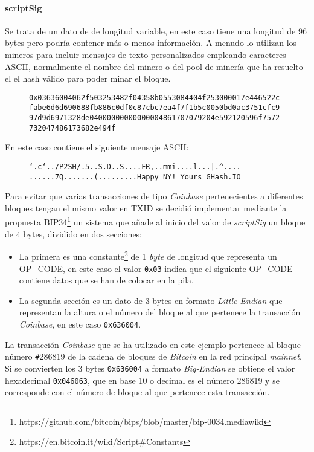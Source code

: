 \documentclass{article}
\begin{document}
    \paragraph{scriptSig}
    Se trata de un dato de de longitud variable, en este caso tiene una longitud de 96 bytes pero podría contener más o menos información. A menudo lo utilizan los mineros para incluir mensajes de texto personalizados empleando caracteres ASCII, normalmente el nombre del minero o del pool de minería que ha resuelto el el hash válido para poder minar el bloque.
    \begin{figure}[H]
        \texttt{0x03636004062f503253482f04358b0553084404f253000017e446522c} \\
        \texttt{fabe6d6d690688fb886c0df0c87cbc7ea4f7f1b5c0050bd0ac3751cfc9}
        \texttt{97d9d6971328de04000000000000004861707079204e592120596f7572}
        \texttt{732047486173682e494f}
    \end{figure}
    
    En este caso contiene el siguiente mensaje ASCII:
    \begin{figure}[H]
    \centering
        \texttt{`.c`../P2SH/.5..S.D..S....FR,..mmi....l...|.\textasciicircum....}
        \texttt{......7Q.......(.........Happy NY! Yours GHash.IO}
    \end{figure}
    
    Para evitar que varias transacciones de tipo \textit{Coinbase} pertenecientes a diferentes bloques tengan el mismo valor en TXID se decidió implementar mediante la propuesta BIP34\footnote{https://github.com/bitcoin/bips/blob/master/bip-0034.mediawiki} un sistema que añade al inicio del valor de \textit{scriptSig} un bloque de 4 bytes, dividido en dos secciones:
    
    \begin{itemize}
    \item La primera es una constante\footnote{https://en.bitcoin.it/wiki/Script\#Constants} de 1 \textit{byte} de longitud que representa un OP\_CODE, en este caso el valor \texttt{0x03} indica que el siguiente OP\_CODE contiene datos que se han de colocar en la pila.
    \item La segunda sección es un dato de 3 bytes en formato \textit{Little-Endian} que representan la altura o el número del bloque al que pertenece la transacción \textit{Coinbase}, en este caso \texttt{0x636004}.
    \end{itemize}
    
    La transacción \textit{Coinbase} que se ha utilizado en este ejemplo pertenece al bloque número \texttt{\#}286819 de la cadena de bloques de \textit{Bitcoin} en la red principal \textit{mainnet}. Si se convierten los 3 bytes \texttt{0x636004} a formato \textit{Big-Endian} se obtiene el valor hexadecimal \texttt{0x046063}, que en base 10 o decimal es el número 286819 y se corresponde con el número de bloque al que pertenece esta transacción.
    
\end{document}
